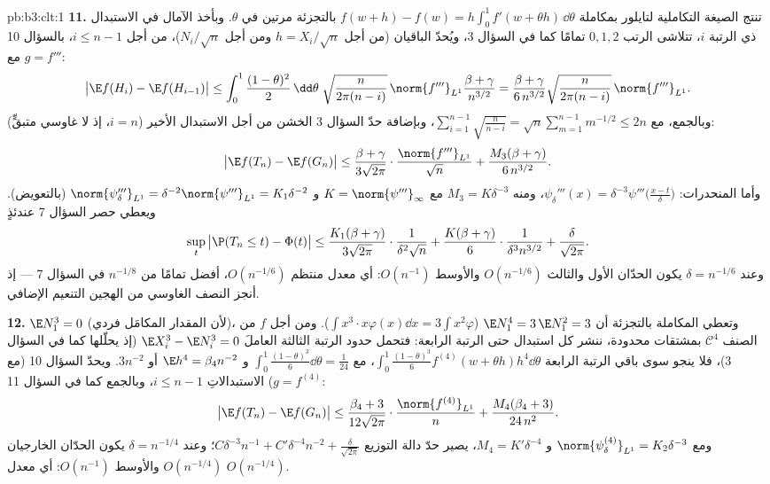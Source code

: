 \begin{solution}{pb:b3:clt:1}
\textbf{11.} تنتج الصيغة التكاملية لتايلور بمكاملة $f(w + h) - f(w) =
h\int_0^1f'(w + \theta h)\,\dd\theta$
بالتجزئة مرتين في $\theta$. وبأخذ الآمال في الاستبدال ذي الرتبة
$i$، تتلاشى الرتب $0, 1, 2$ تمامًا كما في السؤال 3، ويُحدّ
الباقيان (من أجل $h = X_i/\sqrt n$ ومن أجل $N_i/\sqrt n$)، من أجل
$i \leq n - 1$، بالسؤال 10 مع $g = f'''$:
\[
\bigl|\E f(H_i) - \E f(H_{i-1})\bigr| \leq
\int_0^1\frac{(1-\theta)^2}2\,\dd\theta\;
\sqrt{\frac{n}{2\pi(n-i)}}\,\norm{f'''}_{L^1}
\frac{\beta + \gamma}{n^{3/2}}
= \frac{\beta + \gamma}{6\,n^{3/2}}
\sqrt{\frac{n}{2\pi(n-i)}}\,\norm{f'''}_{L^1} .
\]
وبالجمع، مع $\sum_{i=1}^{n-1}\sqrt{\frac n{n-i}} =
\sqrt n\sum_{m=1}^{n-1}m^{-1/2} \leq 2n$، وبإضافة حدّ السؤال 3 الخشن من أجل
الاستبدال الأخير ($i = n$، إذ لا غاوسي متبقٍّ):
\[
\bigl|\E f(T_n) - \E f(G_n)\bigr| \leq
\frac{\beta + \gamma}{3\sqrt{2\pi}}\cdot
\frac{\norm{f'''}_{L^1}}{\sqrt n} +
\frac{M_3(\beta + \gamma)}{6\,n^{3/2}} .
\]
وأما المنحدرات: $\psi_\delta'''(x) =
\delta^{-3}\psi'''\bigl(\frac{x - t}\delta\bigr)$، ومنه $M_3 = K\delta^{-3}$ مع $K = \norm{\psi'''}_\infty$ و $\norm{\psi_\delta'''}_{L^1} = \delta^{-2}
\norm{\psi'''}_{L^1} = K_1\delta^{-2}$
(بالتعويض). ويعطي حصر السؤال 7 عندئذٍ
\[
\sup_t\,\bigl|\P(T_n \leq t) - \Phi(t)\bigr| \leq
\frac{K_1(\beta + \gamma)}{3\sqrt{2\pi}}\cdot
\frac1{\delta^2\sqrt n} +
\frac{K(\beta + \gamma)}{6}\cdot
\frac1{\delta^3n^{3/2}} + \frac\delta{\sqrt{2\pi}} .
\]
وعند $\delta = n^{-1/6}$ يكون الحدّان الأول والثالث $O(n^{-1/6})$ والأوسط
$O(n^{-1})$: أي معدل منتظم $O(n^{-1/6})$، أفضل تمامًا من
$n^{-1/8}$ في السؤال 7 --- إذ أنجز النصف الغاوسي من الهجين
التنعيم الإضافي.

\textbf{12.} $\E N_1^3 = 0$ (لأن المقدار المكامَل فردي)، وتعطي
المكاملة بالتجزئة أن $\E N_1^4 = 3\,\E N_1^2 = 3$ ($\int x^3\cdot x\varphi(x)\dd x =
3\int x^2\varphi$). ومن أجل $f$ من الصنف
$\mathcal C^4$ بمشتقات محدودة، ننشر كل استبدال حتى الرتبة
الرابعة: فتحمل حدود الرتبة الثالثة العاملَ $\E X_i^3 - \E N_i^3 =
0$ (إذ يحلّلها
 كما في السؤال 3)، فلا ينجو سوى باقي الرتبة الرابعة
$\int_0^1\frac{(1-\theta)^3}6f^{(4)}(w + \theta
h)h^4\dd\theta$، مع $\int_0^1
\frac{(1-\theta)^3}6\dd\theta = \frac1{24}$ و $\E h^4 =
\beta_4n^{-2}$ أو $3n^{-2}$. ويحدّ السؤال 10
(مع $g =
f^{(4)}$) الاستبدالاتِ $i \leq n - 1$، وبالجمع كما في
السؤال 11:
\[
\bigl|\E f(T_n) - \E f(G_n)\bigr| \leq
\frac{\beta_4 + 3}{12\sqrt{2\pi}}\cdot
\frac{\norm{f^{(4)}}_{L^1}}{n} +
\frac{M_4(\beta_4 + 3)}{24\,n^2} .
\]
ومع $\norm{\psi_\delta^{(4)}}_{L^1} = K_2\delta^{-3}$ و $M_4 = K'\delta^{-4}$، يصير حدّ دالة التوزيع $C\delta^{-3}n^{-1} + C'\delta^{-4}n^{-2} +
\frac\delta{\sqrt{2\pi}}$؛ وعند
$\delta = n^{-1/4}$ يكون الحدّان الخارجيان $O(n^{-1/4})$ والأوسط
$O(n^{-1})$: أي معدل $O(n^{-1/4})$.


\end{solution}
